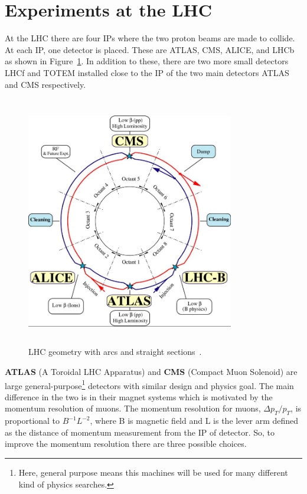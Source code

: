 {{{




\section{Experiments at the LHC} %
\label{sec:experiments_at_the_lhc}

At the LHC there are four IPs where the two proton beams are made to collide. At each IP, one detector is placed. These are ATLAS, CMS, ALICE, and LHCb as shown in Figure~\ref{fig:LHCgeometry}. In addition to these, there are two more small detectors LHCf and TOTEM installed close to the IP of the two main detectors ATLAS and CMS respectively.
\begin{figure}[!htbp]
	\centering
	\includegraphics[width=0.81\textwidth,height=11cm]{figures/LHC/lhc-schematic.jpg}
	\caption{LHC geometry with arcs and straight sections~\cite{CERN}.}
	\label{fig:LHCgeometry}
\end{figure}
\newline
{\bf ATLAS} (A Toroidal LHC Apparatus) and {\bf CMS} (Compact Muon Solenoid) are large general-purpose\footnote{Here, general purpose means this machines will be used for many different kind of physics searches.} detectors with similar design and physics goal. The main difference in the two is in their magnet systems which is motivated by the momentum resolution of muons. The momentum resolution for muons, $\Delta p_T/p_T$, is proportional to  $B^{-1}L^{-2}$, where B is magnetic field and L is the lever arm defined as the distance of momentum measurement from the IP of detector. So, to improve the momentum resolution there are three possible choices.

}}}
